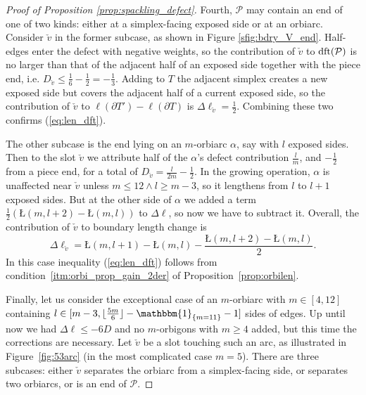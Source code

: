 \documentclass{amsart}
\newcommand{\dft}{\textnormal{dft}}
\begin{document}
\begin{proof}[Proof of Proposition \ref{prop:spackling_defect}]
Fourth, $\mathcal{P}$ may contain an end of one of two kinds: either at a simplex-facing exposed side or at an orbiarc. Consider $\check{v}$ in the former subcase, as shown in Figure \ref{sfig:bdry_V_end}. Half-edges enter the defect with negative weights, so the contribution of $\check{v}$ to $\dft(\mathcal{P})$ is no larger than that of the adjacent half of an exposed side together with the piece end, i.e. $D_{\check{v}}\leqslant\frac{1}{6}-\tfrac{1}{2}=-\tfrac{1}{3}$. Adding to $T$ the adjacent simplex creates a new exposed side but covers the adjacent half of a current exposed side, so the contribution of $\check{v}$ to $\ell(\partial T')-\ell(\partial T)$ is $\Delta\ell_{\check{v}}=\frac{1}{2}$. Combining these two confirms (\ref{eq:len_dft}).

The other subcase is the end lying on an $m$-orbiarc $\alpha$, say with $l$ exposed sides. Then to the slot $\check{v}$ we attribute half of the $\alpha$'s defect contribution $\tfrac{l}{m}$, and $-\tfrac{1}{2}$ from a piece end, for a total of $D_{\check{v}}=\tfrac{l}{2m}-\tfrac{1}{2}$. In the growing operation, $\alpha$ is unaffected near $\check{v}$ unless $m\leqslant12\wedge l\geqslant m-3$, so it lengthens from $l$ to $l+1$ exposed sides. But at the other side of $\alpha$ we added a term $\tfrac{1}{2}(Ł(m,l+2)-Ł(m,l))$ to $\Delta\ell$, so now we have to subtract it. Overall, the contribution of $\check{v}$ to boundary length change is
\begin{equation*}
\Delta\ell_{\check{v}}=Ł(m,l+1)-Ł(m,l)-\frac{Ł(m,l+2)-Ł(m,l)}{2}.
\end{equation*}
In this case inequality (\ref{eq:len_dft}) follows from condition~\ref*{itm:orbi_prop_gain_2der} of Proposition~\ref{prop:orbilen}.

Finally, let us consider the exceptional case of an $m$-orbiarc with $m\in[4,12]$ containing $l\in[m-3,\lfloor\tfrac{5m}{6}\rfloor-\mathbbm{1}_{\{m=11\}}-1]$ sides of edges. Up until now we had $\Delta\ell\leqslant-6D$ and no $m$-orbigons with $m\geqslant4$ added, but this time the corrections are necessary. Let $\check{v}$ be a slot touching such an arc, as illustrated in Figure~\ref{fig:53arc} (in the most complicated case $m=5$). There are three subcases: either $\check{v}$ separates the orbiarc from a simplex-facing side, or separates two orbiarcs, or is an end of $\mathcal{P}$.


\end{proof}
\end{document}
